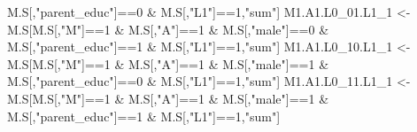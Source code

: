 \documentclass[
]{book}
\newenvironment{Shaded}{\begin{snugshade}}{\end{snugshade}}
\newcommand{\DecValTok}[1]{\textcolor[rgb]{0.00,0.00,0.81}{#1}}
\newcommand{\NormalTok}[1]{#1}
\newcommand{\OtherTok}[1]{\textcolor[rgb]{0.56,0.35,0.01}{#1}}
\newcommand{\SpecialCharTok}[1]{\textcolor[rgb]{0.00,0.00,0.00}{#1}}
\newcommand{\StringTok}[1]{\textcolor[rgb]{0.31,0.60,0.02}{#1}}
\begin{document}
\begin{Shaded}
\begin{Highlighting}[]
\NormalTok{                            M.S[,}\StringTok{"parent\_educ"}\NormalTok{]}\SpecialCharTok{==}\DecValTok{0} \SpecialCharTok{\&}\NormalTok{ M.S[,}\StringTok{"L1"}\NormalTok{]}\SpecialCharTok{==}\DecValTok{1}\NormalTok{,}\StringTok{"sum"}\NormalTok{]}
\NormalTok{  M1.A1.L0\_01.L1\_1 }\OtherTok{\textless{}{-}}\NormalTok{ M.S[M.S[,}\StringTok{"M"}\NormalTok{]}\SpecialCharTok{==}\DecValTok{1} \SpecialCharTok{\&}\NormalTok{ M.S[,}\StringTok{"A"}\NormalTok{]}\SpecialCharTok{==}\DecValTok{1} \SpecialCharTok{\&}\NormalTok{ M.S[,}\StringTok{"male"}\NormalTok{]}\SpecialCharTok{==}\DecValTok{0} \SpecialCharTok{\&} 
\NormalTok{                            M.S[,}\StringTok{"parent\_educ"}\NormalTok{]}\SpecialCharTok{==}\DecValTok{1} \SpecialCharTok{\&}\NormalTok{ M.S[,}\StringTok{"L1"}\NormalTok{]}\SpecialCharTok{==}\DecValTok{1}\NormalTok{,}\StringTok{"sum"}\NormalTok{]}
\NormalTok{  M1.A1.L0\_10.L1\_1 }\OtherTok{\textless{}{-}}\NormalTok{ M.S[M.S[,}\StringTok{"M"}\NormalTok{]}\SpecialCharTok{==}\DecValTok{1} \SpecialCharTok{\&}\NormalTok{ M.S[,}\StringTok{"A"}\NormalTok{]}\SpecialCharTok{==}\DecValTok{1} \SpecialCharTok{\&}\NormalTok{ M.S[,}\StringTok{"male"}\NormalTok{]}\SpecialCharTok{==}\DecValTok{1} \SpecialCharTok{\&} 
\NormalTok{                            M.S[,}\StringTok{"parent\_educ"}\NormalTok{]}\SpecialCharTok{==}\DecValTok{0} \SpecialCharTok{\&}\NormalTok{ M.S[,}\StringTok{"L1"}\NormalTok{]}\SpecialCharTok{==}\DecValTok{1}\NormalTok{,}\StringTok{"sum"}\NormalTok{]}
\NormalTok{  M1.A1.L0\_11.L1\_1 }\OtherTok{\textless{}{-}}\NormalTok{ M.S[M.S[,}\StringTok{"M"}\NormalTok{]}\SpecialCharTok{==}\DecValTok{1} \SpecialCharTok{\&}\NormalTok{ M.S[,}\StringTok{"A"}\NormalTok{]}\SpecialCharTok{==}\DecValTok{1} \SpecialCharTok{\&}\NormalTok{ M.S[,}\StringTok{"male"}\NormalTok{]}\SpecialCharTok{==}\DecValTok{1} \SpecialCharTok{\&} 
\NormalTok{                            M.S[,}\StringTok{"parent\_educ"}\NormalTok{]}\SpecialCharTok{==}\DecValTok{1} \SpecialCharTok{\&}\NormalTok{ M.S[,}\StringTok{"L1"}\NormalTok{]}\SpecialCharTok{==}\DecValTok{1}\NormalTok{,}\StringTok{"sum"}\NormalTok{]}
  

\end{Highlighting}
\end{Shaded}
\end{document}
